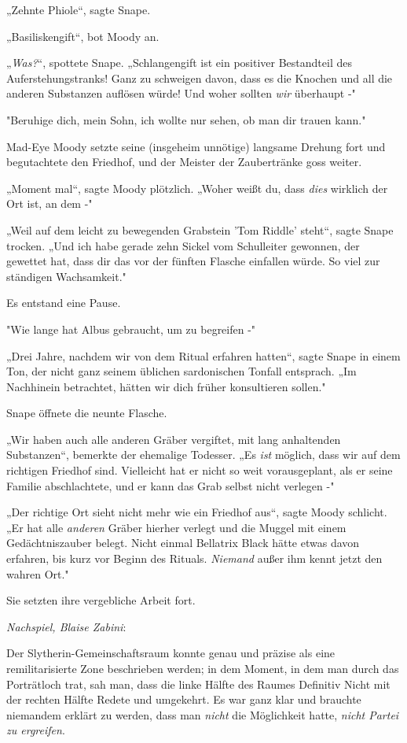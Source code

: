 {„Zehnte Phiole“, sagte Snape.

„Basiliskengift“, bot Moody an.

„\emph{Was?}“, spottete Snape. „Schlangengift ist ein positiver Bestandteil des Auferstehungstranks! Ganz zu schweigen davon, dass es die Knochen und all die anderen Substanzen auflösen würde! Und woher sollten \emph{wir} überhaupt -"

"Beruhige dich, mein Sohn, ich wollte nur sehen, ob man dir trauen kann."

Mad-Eye Moody setzte seine (insgeheim unnötige) langsame Drehung fort und begutachtete den Friedhof, und der Meister der Zaubertränke goss weiter.

„Moment mal“, sagte Moody plötzlich. „Woher weißt du, dass \emph{dies} wirklich der Ort ist, an dem -"

„Weil auf dem leicht zu bewegenden Grabstein 'Tom Riddle' steht“, sagte Snape trocken. „Und ich habe gerade zehn Sickel vom Schulleiter gewonnen, der gewettet hat, dass dir das vor der fünften Flasche einfallen würde. So viel zur ständigen Wachsamkeit."

Es entstand eine Pause.

"Wie lange hat Albus gebraucht, um zu begreifen -"

„Drei Jahre, nachdem wir von dem Ritual erfahren hatten“, sagte Snape in einem Ton, der nicht ganz seinem üblichen sardonischen Tonfall entsprach. „Im Nachhinein betrachtet, hätten wir dich früher konsultieren sollen."

Snape öffnete die neunte Flasche.

„Wir haben auch alle anderen Gräber vergiftet, mit lang anhaltenden Substanzen“, bemerkte der ehemalige Todesser. „Es \emph{ist} möglich, dass wir auf dem richtigen Friedhof sind. Vielleicht hat er nicht so weit vorausgeplant, als er seine Familie abschlachtete, und er kann das Grab selbst nicht verlegen -"

„Der richtige Ort sieht nicht mehr wie ein Friedhof aus“, sagte Moody schlicht. „Er hat alle \emph{anderen} Gräber hierher verlegt und die Muggel mit einem Gedächtniszauber belegt. Nicht einmal Bellatrix Black hätte etwas davon erfahren, bis kurz vor Beginn des Rituals. \emph{Niemand} außer ihm kennt jetzt den wahren Ort."

Sie setzten ihre vergebliche Arbeit fort.

\emph{Nachspiel, Blaise Zabini}:

Der Slytherin-Gemeinschaftsraum konnte genau und präzise als eine remilitarisierte Zone beschrieben werden; in dem Moment, in dem man durch das Porträtloch trat, sah man, dass die linke Hälfte des Raumes Definitiv Nicht mit der rechten Hälfte Redete und umgekehrt. Es war ganz klar und brauchte niemandem erklärt zu werden, dass man \emph{nicht} die Möglichkeit hatte, \emph{nicht Partei zu ergreifen}.

}
